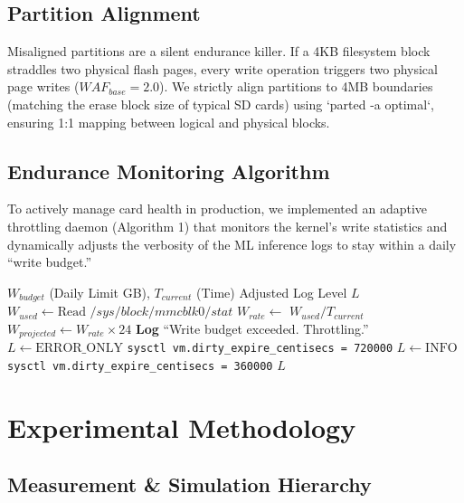 \documentclass[conference]{IEEEtran}
\begin{document}
\subsection{Partition Alignment}
Misaligned partitions are a silent endurance killer. If a 4KB filesystem block straddles two physical flash pages, every write operation triggers two physical page writes ($WAF_{base} = 2.0$). We strictly align partitions to 4MB boundaries (matching the erase block size of typical SD cards) using `parted -a optimal`, ensuring 1:1 mapping between logical and physical blocks.

\subsection{Endurance Monitoring Algorithm}
To actively manage card health in production, we implemented an adaptive throttling daemon (Algorithm 1) that monitors the kernel's write statistics and dynamically adjusts the verbosity of the ML inference logs to stay within a daily ``write budget.''

\begin{algorithm}[h]
\caption{Adaptive Write Throttling Daemon}
\begin{algorithmic}[1]
\REQUIRE $W_{budget}$ (Daily Limit GB), $T_{current}$ (Time)
\ENSURE Adjusted Log Level $L$
\STATE $W_{used} \leftarrow \text{Read } /sys/block/mmcblk0/stat$
\STATE $W_{rate} \leftarrow $ $W_{used} / T_{current}$
\STATE $W_{projected} \leftarrow W_{rate} \times 24$
    \STATE \textbf{Log} ``Write budget exceeded. Throttling.''
    \STATE $L \leftarrow \text{ERROR\_ONLY}$
    \STATE \texttt{sysctl vm.dirty\_expire\_centisecs = 720000}
\ELSE
    \STATE $L \leftarrow \text{INFO}$
    \STATE \texttt{sysctl vm.dirty\_expire\_centisecs = 360000}
\ENDIF
\RETURN $L$
\end{algorithmic}
\label{alg:monitor}
\end{algorithm}

\section{Experimental Methodology}

\subsection{Measurement \& Simulation Hierarchy}
\end{document}
